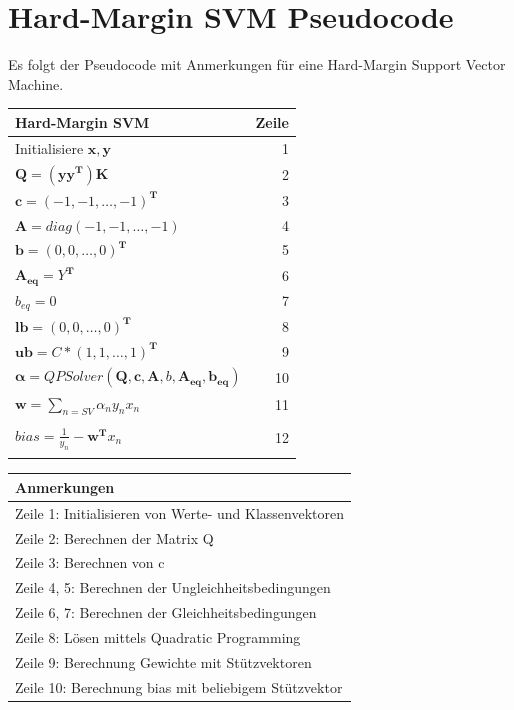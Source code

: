 \documentclass[a4paper,11pt,twoside]{scrreprt}
\begin{document}
\section{Hard-Margin SVM Pseudocode}\label{sec:hsvmpseudo}
Es folgt der Pseudocode mit Anmerkungen für eine Hard-Margin Support Vector Machine.
\begin{table}[H]\label{tab:hmpc}
\begin{tabular}{|l r|}
    \hline
    \textbf{Hard-Margin SVM} & \textbf{Zeile} \\
    \hline
    Initialisiere $\mathbf{x}, \mathbf{y}$ & 1\\
    $\mathbf{Q} = (\mathbf{y}\mathbf{y}^{\mathbf{T}})\mathbf{K}$ & 2\\
    $\mathbf{c} = \left( -1, -1, \ldots, -1 \right)^{\mathbf{T}}$ & 3 \\
    $\mathbf{A} = diag\left( -1, -1, \ldots, -1 \right)$ & 4 \\
    $\mathbf{b} = \left( 0, 0, \ldots, 0 \right)^{\mathbf{T}}$ & 5\\
    $\mathbf{A_{eq}} = Y^{\mathbf{T}}$ & 6\\
    $b_{eq} = 0$ & 7\\
    $\mathbf{lb} = \left( 0, 0, \ldots, 0 \right)^{\mathbf{T}}$ & 8 \\
    $\mathbf{ub} = C * \left( 1, 1, \ldots, 1 \right)^{\mathbf{T}}$ & 9 \\
    $\mathbf{\alpha} = QPSolver\left( \mathbf{Q}, \mathbf{c}, \mathbf{A}, b, \mathbf{A_{eq}}, \mathbf{b_{eq}} \right)$ & 10\\
    $\mathbf{w} = \sum\limits_{n=SV} \alpha_{n} y_{n} x_{n}$  & 11\\
    & \\[-1em]
    $bias = \frac{1}{y_{n}} - \mathbf{w}^{\mathbf{T}}x_{n}$ & 12\\
    & \\
    \hline
\end{tabular}
\begin{tabular}{|l|}
    \hline
    \textbf{Anmerkungen} \\
    \hline
    Zeile 1: Initialisieren von Werte- und Klassenvektoren\\
    Zeile 2: Berechnen der Matrix Q \\
    Zeile 3: Berechnen von c \\
    Zeile 4, 5: Berechnen der Ungleichheitsbedingungen\\
    Zeile 6, 7: Berechnen der Gleichheitsbedingungen\\
    Zeile 8: Lösen mittels Quadratic Programming \\
    Zeile 9: Berechnung Gewichte mit Stützvektoren \\
    Zeile 10: Berechnung bias mit beliebigem Stützvektor \\
    \hline
\end{tabular}
\end{table}
\end{document}
